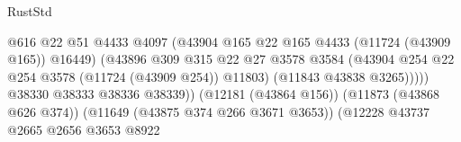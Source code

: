 \begin{lexlean}{RustStd}
\begin{coremodule}
                                                          @616
                                                          @22
                                                          @51
                                                          @4433
                                                          @4097
                                                          (@43904
                                                            @165
                                                            @22
                                                            @165
                                                            @4433
                                                            (@11724 (@43909 @165))
                                                            @16449)
                                                          (@43896
                                                            @309
                                                            @315
                                                            @22
                                                            @27
                                                            @3578
                                                            @3584
                                                            (@43904
                                                              @254
                                                              @22
                                                              @254
                                                              @3578
                                                              (@11724 (@43909 @254))
                                                              @11803)
                                                            (@11843 @43838 @3265)))))
                                                    @38330
                                                    @38333
                                                    @38336
                                                    @38339))
                                                (@12181 (@43864 @156))
                                                (@11873 (@43868 @626 @374))
                                                (@11649 (@43875 @374 @266 @3671 @3653))
                                                (@12228
                                                  @43737
                                                  @2665
                                                  @2656
                                                  @3653
                                                  @8922

\end{coremodule}
\end{lexlean}

